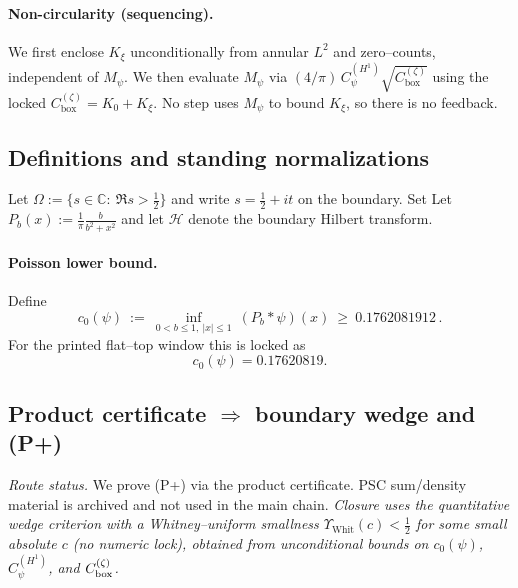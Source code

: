 \documentclass[11pt]{article}
\theoremstyle{definition}
\theoremstyle{remark}
\newcommand{\C}{\mathbb{C}}
\newcommand{\Poisson}{P}
\begin{document}
\paragraph{Non-circularity (sequencing).}
We first enclose \(K_\xi\) unconditionally from annular $L^2$ and zero–counts, independent of \(M_\psi\). We then evaluate \(M_\psi\) via \((4/\pi)\,C_\psi^{(H^1)}\sqrt{C_{\mathrm{box}}^{(\zeta)}}\) using the locked \(C_{\mathrm{box}}^{(\zeta)}=K_0+K_\xi\). No step uses \(M_\psi\) to bound \(K_\xi\), so there is no feedback.

\subsection*{Definitions and standing normalizations}

Let $\Omega:=\{s\in\C:\ \Re s>\tfrac12\}$ and write $s=\tfrac12+it$ on the boundary.
Set
Let $\Poisson_b(x):=\frac{1}{\pi}\frac{b}{b^2+x^2}$ and let $\mathcal H$ denote the boundary Hilbert transform.

\paragraph{Poisson lower bound.}
Define
\[
 c_0(\psi)\ :=\ \inf_{0<b\le 1,\ |x|\le 1}\ (\Poisson_{b}*\psi)(x)\ \ge\ 0.1762081912\,.
\]
For the printed flat--top window this is locked as
\[
  c_0(\psi)=0.17620819.
\]
\subsection*{Product certificate $\Rightarrow$ boundary wedge and (P+)}
\noindent\textit{Route status.} We prove (P+) via the product certificate. PSC sum/density material is archived and not used in the main chain. \emph{Closure uses the quantitative wedge criterion with a Whitney–uniform smallness $\Upsilon_{\mathrm{Whit}}(c)<\tfrac12$ for some small absolute $c$ (no numeric lock), obtained from unconditional bounds on $c_0(\psi)$, $C_\psi^{(H^1)}$, and $C_{\rm box}^{(\zeta)}$.}
\end{document}
